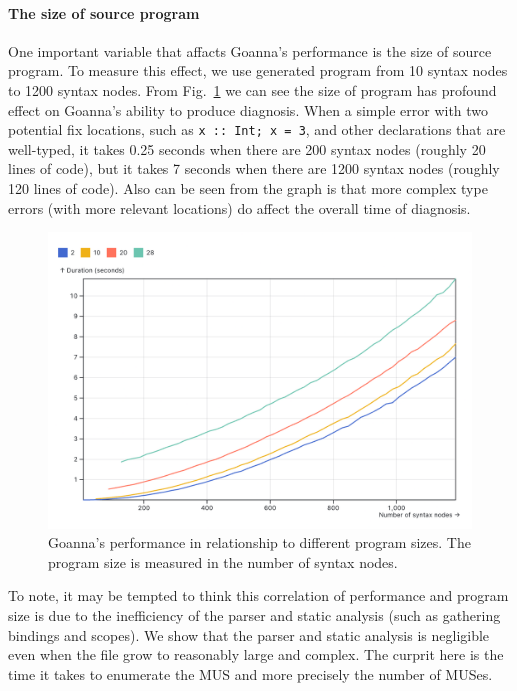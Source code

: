 \documentclass[pdflatex,sn-mathphys-num]{sn-jnl}%
\begin{document}
    \paragraph{\textbf{The size of source program}}

    One important variable that affacts Goanna's performance is the size of source program. To measure this effect, we use generated program from 10 syntax nodes to 1200 syntax nodes. From Fig.~\ref{fig:node-size} we can see the size of program has profound effect on Goanna's ability to produce diagnosis. When a simple error with two potential fix locations, such as \texttt{x :: Int; x = 3}, and other declarations that are well-typed, it takes 0.25 seconds when there are 200 syntax nodes (roughly 20 lines of code), but it takes 7 seconds when there are 1200 syntax nodes (roughly 120 lines of code). Also can be seen from the graph is that more complex type errors (with more relevant locations) do affect the overall time of diagnosis. 

    \begin{figure}[ht]
        \centering
        \includegraphics[width=0.8\linewidth]{images/program-size.png}
        \caption{Goanna's performance in relationship to different program sizes. The program size is measured in the number of syntax nodes.}
        \label{fig:node-size}
    \end{figure}

    To note, it may be tempted to think this correlation of performance and program size is due to the inefficiency of the parser and static analysis (such as gathering bindings and scopes). We show that the parser and static analysis is negligible even when the file grow to reasonably large and complex. The curprit here is the time it takes to enumerate the MUS and more precisely the number of MUSes. 
\end{document}
